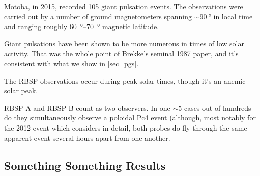 




Motoba, in 2015, recorded 105 giant pulsation events. The observations were carried out by a number of ground magnetometers spanning $\sim \SI{90}{\degree}$ in local time and ranging roughly \SIrange{60}{70}{\degree} magnetic latitude\cite{motoba_2015}. 

Giant pulsations have been shown to be more numerous in times of low solar activity. That was the whole point of Brekke's seminal 1987 paper, and it's consistent with what we show in \cref{sec_pgs}. 

The RBSP observations occur during peak solar times, though it's an anemic solar peak\cite{pesnell_2016}. 

RBSP-A and RBSP-B count as two observers. In one $\sim 5$ cases out of hundreds do they simultaneously observe a poloidal Pc4 event (although, most notably for the 2012 event which \cite{dai_2013} considers in detail, both probes do fly through the same apparent event several hours apart from one another. 






\subsection{Something Something Results}



